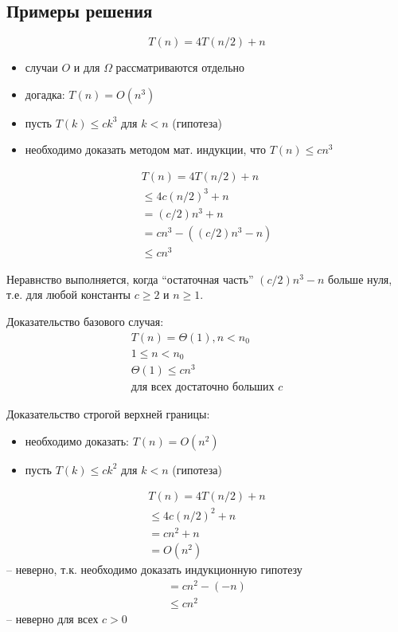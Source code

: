 \documentclass[a4paper,11pt]{article}
\begin{document}
\subsection{Примеры решения}
\begin{equation*}
  T(n) = 4T(n/2) + n
\end{equation*}
\begin{itemize}
\item случаи $O$ и для $\Omega$ рассматриваются отдельно
\item догадка: $T(n) = O(n^3)$
\item пусть $T(k) \leqslant c k^3$ для $k < n$ (гипотеза)
\item необходимо доказать методом мат. индукции, что $T(n) \leqslant c n^3$
\end{itemize}
\begin{align*}
  T(n) = 4T(n/2) + n \\
  \leqslant 4c(n/2)^3 + n \\
  = (c/2)n^3 + n \\
  = c n^3 - ((c/2)n^3 -n) \\
  \leqslant c n^3
\end{align*}

Неравнство выполняется, когда ``остаточная часть'' $(c/2)n^3 -n$ больше нуля,
т.е. для любой константы $c \geqslant 2$ и $n \geqslant 1$.

Доказательство базового случая:
\begin{align*}
  T(n) = \Theta(1), n < n_0 \\
    1 \leqslant n < n_0 \\
    \Theta(1) \leqslant c n^3 \\
    \text{для всех достаточно больших } c
\end{align*}

Доказательство строгой верхней границы:
\begin{itemize}
\item необходимо доказать: $T(n) = O(n^2)$
\item пусть $T(k) \leqslant c k^2$ для $k < n$ (гипотеза)
\end{itemize}
\begin{align*}
  T(n) = 4T(n/2) + n \\
    \leqslant 4c(n/2)^2 + n \\
    = c n^2 + n \\
    = O(n^2)
\end{align*}
-- неверно, т.к. необходимо доказать индукционную гипотезу
\begin{align*}
    = c n^2 - (-n)\\
    \leqslant c n^2
\end{align*}
-- неверно для всех $c > 0$
\end{document}
